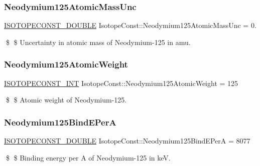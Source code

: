 \subsubsection{\texorpdfstring{Neodymium125\+Atomic\+Mass\+Unc}{Neodymium125AtomicMassUnc}}
{\footnotesize\ttfamily \mbox{\hyperlink{group___isotope_const-_macros_ga8f45a7272ce02c0b4c65c44636ed719a}{I\+S\+O\+T\+O\+P\+E\+C\+O\+N\+S\+T\+\_\+\+D\+O\+U\+B\+LE}} Isotope\+Const\+::\+Neodymium125\+Atomic\+Mass\+Unc = 0.}

\$ \$ Uncertainty in atomic mass of Neodymium-\/125 in amu. \mbox{\label{group___isotope_const-_neodymium-_nd125_gace1ccf8018df7e9df8275ef6220a3e8c}} 
\subsubsection{\texorpdfstring{Neodymium125\+Atomic\+Weight}{Neodymium125AtomicWeight}}
{\footnotesize\ttfamily \mbox{\hyperlink{group___isotope_const-_macros_ga5f18360b3e99483a35c32d789e62621c}{I\+S\+O\+T\+O\+P\+E\+C\+O\+N\+S\+T\+\_\+\+I\+NT}} Isotope\+Const\+::\+Neodymium125\+Atomic\+Weight = 125}

\$ \$ Atomic weight of Neodymium-\/125. \mbox{\label{group___isotope_const-_neodymium-_nd125_ga1302544e4a6c87efc036027cb3074565}} 
\subsubsection{\texorpdfstring{Neodymium125\+Bind\+E\+PerA}{Neodymium125BindEPerA}}
{\footnotesize\ttfamily \mbox{\hyperlink{group___isotope_const-_macros_ga8f45a7272ce02c0b4c65c44636ed719a}{I\+S\+O\+T\+O\+P\+E\+C\+O\+N\+S\+T\+\_\+\+D\+O\+U\+B\+LE}} Isotope\+Const\+::\+Neodymium125\+Bind\+E\+PerA = 8077}

\$ \$ Binding energy per A of Neodymium-\/125 in keV. \mbox{\label{group___isotope_const-_neodymium-_nd125_ga3475600f9425b6a93ed4f266ff93727d}} 

